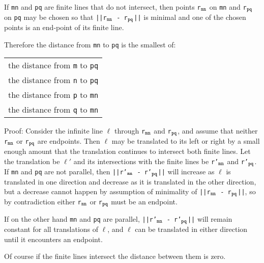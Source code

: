 \documentclass[12pt]{article}
\begin{document}
\begin{theorem}
\label{FINITE-LINE-DISTANCE-THEOREM}
If {\tt mn} and {\tt pq} are finite lines that do not intersect, then
points {\tt r$_{\tt mn}$} on {\tt mn} and
{\tt r$_{\tt pq}$} on {\tt pq} may be chosen so that
{\tt ||r$_{\tt mn}$ - r$_{\tt pq}$||} is minimal and
one of the chosen points is an end-point of its finite line.

Therefore the distance from {\tt mn} to {\tt pq} is the
smallest of: \\
\hspace*{0.5in}\begin{tabular}{l}
the distance from {\tt m} to {\tt pq} \\
the distance from {\tt n} to {\tt pq} \\
the distance from {\tt p} to {\tt mn} \\
the distance from {\tt q} to {\tt mn} \\
\end{tabular}
\end{theorem}

\begin{indpar}{0.3in}
Proof:  Consider the infinite line $\ell$ through
{\tt r$_{\tt mn}$} and {\tt r$_{\tt pq}$}, and assume that
neither
{\tt r$_{\tt mn}$} or {\tt r$_{\tt pq}$} are endpoints.
Then $\ell$ may be translated to its left or right by
a small enough amount that the translation continues
to intersect both finite lines.  Let the translation
be $\ell'$ and its intersections with the finite lines be
{\tt r'$_{\tt mn}$} and {\tt r'$_{\tt pq}$}.
If {\tt mn} and {\tt pq} are not parallel, then
{\tt ||r'$_{\tt mn}$ - r'$_{\tt pq}$||} will increase
as $\ell$ is translated in one direction and decrease as
it is translated in the other direction, but a decrease
cannot happen by assumption of minimality of
{\tt ||r$_{\tt mn}$ - r$_{\tt pq}$||}, so by contradiction either
{\tt r$_{\tt mn}$} or {\tt r$_{\tt pq}$} must be an endpoint.

If on the other hand {\tt mn} and {\tt pq} are parallel,
{\tt ||r'$_{\tt mn}$ - r'$_{\tt pq}$||} will remain constant
for all translations of $\ell$, and $\ell$ can be translated
in either direction until it encounters an endpoint.
\end{indpar}

Of course if the finite lines intersect the distance between
them is zero.

\newpage
\end{document}
